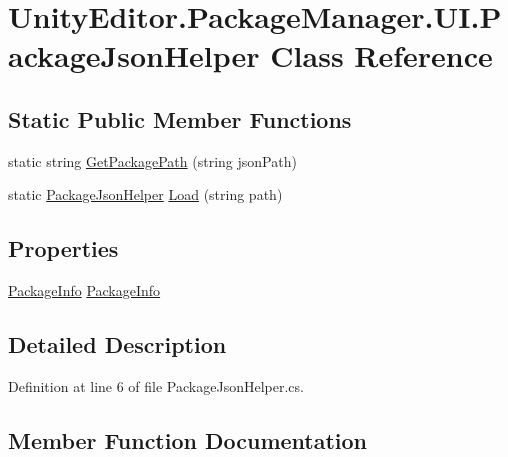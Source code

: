 \hypertarget{class_unity_editor_1_1_package_manager_1_1_u_i_1_1_package_json_helper}{}\section{Unity\+Editor.\+Package\+Manager.\+U\+I.\+Package\+Json\+Helper Class Reference}
\label{class_unity_editor_1_1_package_manager_1_1_u_i_1_1_package_json_helper}
\subsection*{Static Public Member Functions}
\begin{DoxyCompactItemize}
\item 
static string \mbox{\hyperlink{class_unity_editor_1_1_package_manager_1_1_u_i_1_1_package_json_helper_acc11a05c4a2b898a4ed4dc80fe988257}{Get\+Package\+Path}} (string json\+Path)
\item 
static \mbox{\hyperlink{class_unity_editor_1_1_package_manager_1_1_u_i_1_1_package_json_helper}{Package\+Json\+Helper}} \mbox{\hyperlink{class_unity_editor_1_1_package_manager_1_1_u_i_1_1_package_json_helper_af7be9c6cd487025aec0948777e03b73b}{Load}} (string path)
\end{DoxyCompactItemize}
\subsection*{Properties}
\begin{DoxyCompactItemize}
\item 
\mbox{\hyperlink{class_unity_editor_1_1_package_manager_1_1_u_i_1_1_package_info}{Package\+Info}} \mbox{\hyperlink{class_unity_editor_1_1_package_manager_1_1_u_i_1_1_package_json_helper_ac71f2561cdb1ebe4862dbe30ce25f768}{Package\+Info}}
\end{DoxyCompactItemize}


\subsection{Detailed Description}


Definition at line 6 of file Package\+Json\+Helper.\+cs.



\subsection{Member Function Documentation}
\mbox{\label{class_unity_editor_1_1_package_manager_1_1_u_i_1_1_package_json_helper_acc11a05c4a2b898a4ed4dc80fe988257}} 
